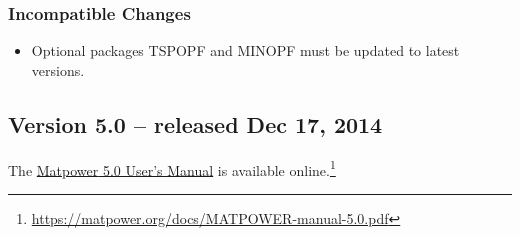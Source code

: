 \documentclass[12pt]{article}
\newcommand{\matpower}[0]{{\sc Matpower}}
\numberwithin{equation}{section}
\numberwithin{table}{section}
\numberwithin{figure}{section}
\begin{document}
\begin{appendices}
\subsubsection*{Incompatible Changes}
\begin{itemize}
\item Optional packages TSPOPF and MINOPF must be updated to latest versions.
\end{itemize}


\clearpage
\subsection{Version 5.0 -- released Dec 17, 2014}
\label{app:v50}

The \href{https://matpower.org/docs/MATPOWER-manual-5.0.pdf}{\matpower{} 5.0 User's Manual} is available online.\footnote{\url{https://matpower.org/docs/MATPOWER-manual-5.0.pdf}}


\end{appendices}
\end{document}
